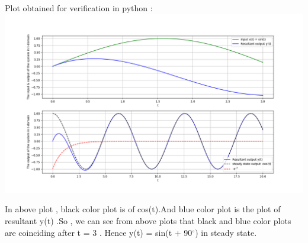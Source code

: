 \documentclass[12pt]{beamer}
\begin{document}
\begin{frame}{}

Plot obtained for verification in python :
\setlength{\parindent}{1cm}
\includegraphics[scale=0.32, angle=0]{Figure_1.png}



\end{frame}
\begin{frame}
In above plot , black color plot is of cos(t).And blue color plot is the plot of resultant y(t) .So , we can see from above plots that black and blue color plots are coinciding after t = 3 . Hence y(t) = sin(t + 90$^{\circ}$) in steady state.

\end{frame}
\end{document}
